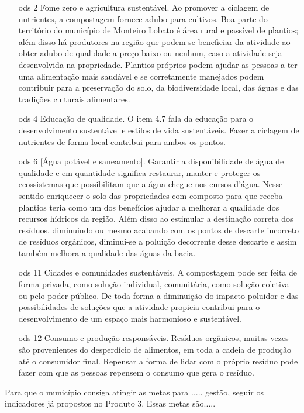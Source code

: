 \begin{itemize}
	\item[\gls{ods} 2] Fome zero e agricultura sustentável. Ao promover a ciclagem de nutrientes, a compostagem fornece adubo para cultivos. Boa parte do território do município de Monteiro Lobato é área rural e passível de plantios; além disso há produtores na região que podem se beneficiar da atividade ao obter adubo de qualidade a preço baixo ou nenhum, caso a atividade seja desenvolvida na propriedade. Plantios próprios podem ajudar as pessoas a ter uma alimentação mais saudável e se corretamente manejados podem contribuir para a preservação do solo, da biodiversidade local, das águas e das tradições culturais alimentares.
	\item[\gls{ods} 4] Educação de qualidade. O item 4.7 fala da educação para o desenvolvimento sustentável e estilos de vida sustentáveis. Fazer a ciclagem de nutrientes de forma local contribui para ambos os pontos.
	\item[\gls{ods} 6] [Água potável e saneamento]. Garantir a disponibilidade de água de qualidade e em quantidade significa restaurar, manter e proteger os ecossistemas que possibilitam que a água chegue nos cursos d'água. Nesse sentido enriquecer o solo das propriedades com composto para que receba plantios teria como um dos benefícios ajudar a melhorar a qualidade dos recursos hídricos da região. Além disso ao estimular a destinação correta dos resíduos, diminuindo ou mesmo acabando com os pontos de descarte incorreto de resíduos orgânicos, diminui-se a poluição decorrente desse descarte e assim também melhora a qualidade das águas da bacia. 
	\item[\gls{ods} 11]	Cidades e comunidades sustentáveis. A compostagem pode ser feita de forma privada, como solução individual, comunitária, como solução coletiva ou pelo poder público. De toda forma a diminuição do impacto poluidor e das possibilidades de soluções que a atividade propicia contribui para o desenvolvimento de um espaço mais harmonioso e sustentável.
	\item[\gls{ods} 12] Consumo e produção responsáveis. Resíduos orgânicos, muitas vezes são provenientes do desperdício de alimentos, em toda a cadeia de produção até o consumidor final. Repensar a forma de lidar com o próprio resíduo pode fazer com que as pessoas repensem o consumo que gera o resíduo.  
\end{itemize}


Para que o município consiga atingir as metas para ..... gestão, seguir os indicadores já propostos no Produto 3. Essas metas são.....




